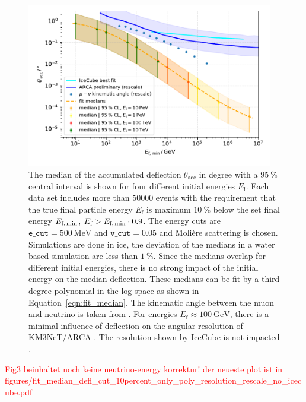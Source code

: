 \documentclass[pdflatex, sn-mathphys]{sn-jnl}%
\theoremstyle{thmstyleone}%
\theoremstyle{thmstyletwo}%
\theoremstyle{thmstylethree}%
\begin{document}
\begin{figure}
    \centering 
    \includegraphics[width=0.96\textwidth]{../../deflection/plots/FINAL/fit_median_defl_cut_10percent_only_poly_new_resolution_rescale_no_icecube_paper_final.pdf}
    \caption{The median of the accumulated deflection $\theta_{\text{acc}}$ in degree 
    with a $\SI{95}{\percent}$ 
    central interval is shown for four different initial energies $E_{\text{i}}$. 
    Each data set includes more than $\num{50000}$ events with the requirement 
    that the true final particle energy $E_{\text{f}}$ is maximum 
    $\SI{10}{\percent}$ below the set final energy $E_{\text{f,\,min}}$,   
    $E_{\text{f}} > E_{\text{f,\,min}} \cdot 0.9$. The energy cuts are $\texttt{e\_cut} = \SI{500}{\mega\electronvolt}$ and $\texttt{v\_cut} = 0.05$ and 
    Molière scattering is chosen. Simulations are done in ice, the deviation 
    of the medians in a water based simulation are less than $\SI{1}{\percent}$.
    Since the medians overlap for different initial energies, there is no 
    strong impact of the initial energy on the median deflection. These 
    medians can be fit by a third degree polynomial in the log-space as 
    shown in Equation~\eqref{eqn:fit_median}. The kinematic angle between the muon and 
    neutrino is taken from \cite{KM3NeT_Resolution2016}.
    For energies 
    $E_{\text{f}} \approx \SI{100}{\giga\electronvolt}$, there is a minimal influence of deflection on the angular resolution of 
    KM3NeT/ARCA \cite{KM3NeT_Resolution2021}. The resolution shown by IceCube is not 
    impacted \cite{IceCube_Resolution2021}.}
    \label{fig:fit_median}
\end{figure}


\textcolor{red}{Fig3 beinhaltet noch keine neutrino-energy korrektur! der neueste plot ist in figures/fit\_median\_defl\_cut\_10percent\_only\_poly\_resolution\_rescale\_no\_icecube.pdf}
\end{document}

